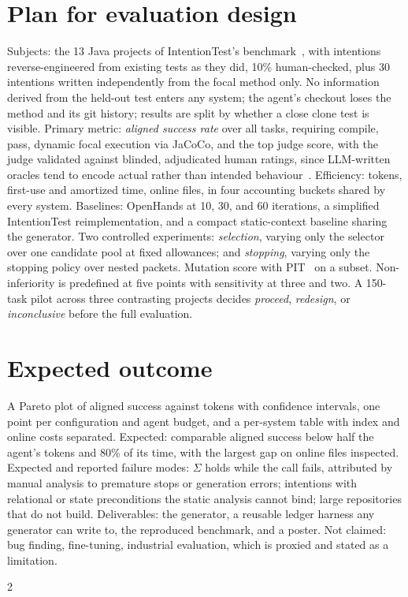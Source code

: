 \documentclass[10pt]{article}
\newcommand{\suff}{\ensuremath{\Sigma}\xspace}
\begin{document}
\section*{Plan for evaluation design}
Subjects: the 13 Java projects of IntentionTest's benchmark~\cite{qi2025intentiontest}, with intentions reverse-engineered from existing tests as they did, 10\% human-checked, plus 30 intentions written independently from the focal method only. No information derived from the held-out test enters any system; the agent's checkout loses the method and its git history; results are split by whether a close clone test is visible. Primary metric: \emph{aligned success rate} over all tasks, requiring compile, pass, dynamic focal execution via JaCoCo, and the top judge score, with the judge validated against blinded, adjudicated human ratings, since LLM-written oracles tend to encode actual rather than intended behaviour~\cite{konstantinou2024oracles}. Efficiency: tokens, first-use and amortized time, online files, in four accounting buckets shared by every system. Baselines: OpenHands at 10, 30, and 60 iterations, a simplified IntentionTest reimplementation, and a compact static-context baseline sharing the generator. Two controlled experiments: \emph{selection}, varying only the selector over one candidate pool at fixed allowances; and \emph{stopping}, varying only the stopping policy over nested packets. Mutation score with PIT~\cite{coles2016pit} on a subset. Non-inferiority is predefined at five points with sensitivity at three and two. A 150-task pilot across three contrasting projects decides \emph{proceed}, \emph{redesign}, or \emph{inconclusive} before the full evaluation.

\section*{Expected outcome}
A Pareto plot of aligned success against tokens with confidence intervals, one point per configuration and agent budget, and a per-system table with index and online costs separated. Expected: comparable aligned success below half the agent's tokens and 80\% of its time, with the largest gap on online files inspected. Expected and reported failure modes: \suff holds while the call fails, attributed by manual analysis to premature stops or generation errors; intentions with relational or state preconditions the static analysis cannot bind; large repositories that do not build. Deliverables: the generator, a reusable ledger harness any generator can write to, the reproduced benchmark, and a poster. Not claimed: bug finding, fine-tuning, industrial evaluation, which is proxied and stated as a limitation.

{\scriptsize
\begin{multicols}{2}


\end{multicols}
}
\end{document}
